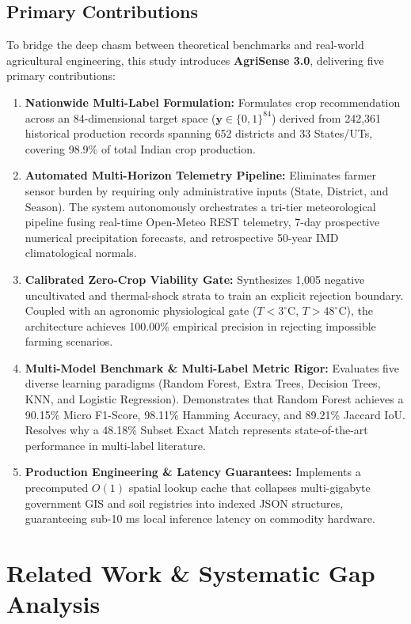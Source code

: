 \documentclass[conference]{IEEEtran}
\begin{document}
\subsection{Primary Contributions}
To bridge the deep chasm between theoretical benchmarks and real-world agricultural engineering, this study introduces \textbf{AgriSense 3.0}, delivering five primary contributions:
\begin{enumerate}
    \item \textbf{Nationwide Multi-Label Formulation:} Formulates crop recommendation across an 84-dimensional target space ($\mathbf{y} \in \{0, 1\}^{84}$) derived from 242,361 historical production records spanning 652 districts and 33 States/UTs, covering 98.9\% of total Indian crop production.
    \item \textbf{Automated Multi-Horizon Telemetry Pipeline:} Eliminates farmer sensor burden by requiring only administrative inputs ($\text{State}$, $\text{District}$, and $\text{Season}$). The system autonomously orchestrates a tri-tier meteorological pipeline fusing real-time Open-Meteo REST telemetry, 7-day prospective numerical precipitation forecasts, and retrospective 50-year IMD climatological normals.
    \item \textbf{Calibrated Zero-Crop Viability Gate:} Synthesizes 1,005 negative uncultivated and thermal-shock strata to train an explicit rejection boundary. Coupled with an agronomic physiological gate ($T < 3^\circ\text{C}$, $T > 48^\circ\text{C}$), the architecture achieves 100.00\% empirical precision in rejecting impossible farming scenarios.
    \item \textbf{Multi-Model Benchmark \& Multi-Label Metric Rigor:} Evaluates five diverse learning paradigms (Random Forest, Extra Trees, Decision Trees, KNN, and Logistic Regression). Demonstrates that Random Forest achieves a 90.15\% Micro F1-Score, 98.11\% Hamming Accuracy, and 89.21\% Jaccard IoU. Resolves why a 48.18\% Subset Exact Match represents state-of-the-art performance in multi-label literature.
    \item \textbf{Production Engineering \& Latency Guarantees:} Implements a precomputed $O(1)$ spatial lookup cache that collapses multi-gigabyte government GIS and soil registries into indexed JSON structures, guaranteeing sub-10 ms local inference latency on commodity hardware.
\end{enumerate}

\section{Related Work \& Systematic Gap Analysis}
\end{document}
